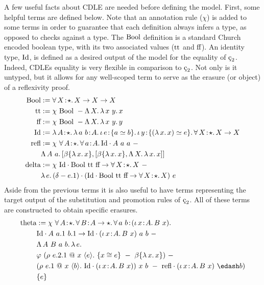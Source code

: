 A few useful facts about CDLE are needed before defining the model.
First, some helpful terms are defined below.
Note that an annotation rule ($\chi$) is added to some terms in order to guarantee that each definition always infers a type, as opposed to checks against a type.
The $\textnormal{Bool}$ definition is a standard Church encoded boolean type, with its two associated values ($\textnormal{tt}$ and $\textnormal{ff}$).
An identity type, $\textnormal{Id}$, is defined as a desired output of the model for the equality of $\ced$.
Indeed, CDLEs equality is very flexible in comparison to $\ced$.
Not only is it untyped, but it allows for any well-scoped term to serve as the erasure (or object) of a reflexivity proof.
\begin{align*}
    \cBool &:= \abs{\forall}{X}{\star}{X \to X \to X} \\
    \ctt &:= \chi\ \cBool\ - \absu{\Lambda}{X}{
        \absu{\lambda}{x\ y}{x}
    } \\
    \cff &:= \chi\ \cBool\ - \absu{\Lambda}{X}{
        \absu{\lambda}{x\ y}{y}
    } \\
    \cId &:= \abs{\lambda}{A}{\star}{
        \abs{\lambda}{a\ b}{A}{
            \abs{\iota}{e}{\{ a \simeq b \}}{
                \abs{\iota}{y}{\{ (\absu{\lambda}{x}{x}) \simeq e \}}{
                    \abs{\forall}{X}{\star}{
                        X \to X
                    }
                }
            }
        }
    } \\
    \crefl &:= \chi\ \abs{\forall}{A}{\star}{
            \abs{\forall}{a}{A}{
                \cId \cdot A\ a\ a
            }
        }\ -
        \\ &\absu{\Lambda}{A\ a}{
        [\beta\{ \absu{\lambda}{x}{x} \}, [\beta\{ \absu{\lambda}{x}{x} \}, \absu{\Lambda}{X}{\absu{\lambda}{x}{x}}]]
    } \\
    \cdelta &:= \chi\ \cId \cdot \cBool\ \ctt\ \cff \to \abs{\forall}{X}{\star}{X}\ -
        \\ &\absu{\lambda}{e}{
        (\delta - e.1) \cdot (\cId \cdot \cBool\ \ctt\ \cff \to \abs{\forall}{X}{\star}{X})\ e
    }
\end{align*}
Aside from the previous terms it is also useful to have terms representing the target output of the substitution and promotion rules of $\ced$.
All of these terms are constructed to obtain specific erasures.
\begin{align*}
    \ctheta &:= \chi\ 
        \abs{\forall}{A}{\star}{
            \abs{\forall}{B}{A \to \star}{
                \abs{\forall}{a\ b}{(\abs{\iota}{x}{A}{B\ x})}{
                    \\ &\cId \cdot A\ a.1\ b.1 \to \cId \cdot (\abs{\iota}{x}{A}{B\ x})\ a\ b
                }
            }
        }\ -
        \\ &\absu{\Lambda}{A\ B\ a\ b}{
            \absu{\lambda}{e}{
                \\ &\varphi\ (\rho\ e.2.1\ @\ x\ \langle e \rangle.\ \{ x \cong e \}\ -\ \beta\{ \absu{\lambda}{x}{x} \})\ -
                \\ &(\rho\ e.1\ @\ x\ \langle b \rangle.\ \cId \cdot (\abs{\iota}{x}{A}{B\ x}))\ x\ b\ -\ \crefl \cdot (\abs{\iota}{x}{A}{B\ x})\ \edash b)
                \\ &\{ e \} 
            }
        }
\end{align*}
